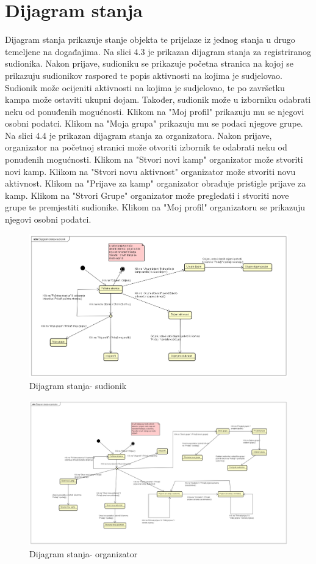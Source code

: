 			\eject
		
		\section{Dijagram stanja}
		
		Dijagram stanja prikazuje stanje objekta te prijelaze iz jednog stanja u drugo temeljene na događajima. Na slici 4.3 je prikazan dijagram stanja za registriranog sudionika. Nakon prijave, sudioniku se prikazuje početna stranica na kojoj se prikazuju sudionikov raspored te popis aktivnosti na kojima je sudjelovao. Sudionik može ocijeniti aktivnosti na kojima je sudjelovao, te po završetku kampa može ostaviti ukupni dojam. Također, sudionik može u izborniku odabrati neku od ponuđenih mogućnosti. Klikom na "Moj profil" prikazuju mu se njegovi osobni podatci. Klikom na "Moja grupa" prikazuju mu se podaci njegove grupe. Na slici 4.4 je prikazan dijagram stanja za organizatora. Nakon prijave, organizator na početnoj stranici može otvoriti izbornik te odabrati neku od ponuđenih mogućnosti. Klikom na "Stvori novi kamp" organizator može stvoriti novi kamp. Klikom na "Stvori novu aktivnost" organizator može stvoriti novu aktivnost. Klikom na "Prijave za kamp" organizator obrađuje pristigle prijave za kamp. Klikom na "Stvori Grupe" organizator može pregledati i stvoriti nove grupe te premjestiti sudionike. Klikom na "Moj profil" organizatoru se prikazuju njegovi osobni podatci.  
		\begin{figure}[H]
			\centerline{\includegraphics[width=\linewidth]{slike/Dijagram_stanja_sudionik.png}}
			\caption{Dijagram stanja- sudionik }
			\label{fig:dijagram_stanja_sudionik}
		\end{figure}
		
		\eject	
		
		\begin{figure}[H]
			\centerline{\includegraphics[width=\linewidth]{slike/Dijagram_stanja_organizator.png}}
			\caption{Dijagram stanja- organizator }
			\label{fig:dijagram_stanja_organizator}
		\end{figure}
		
		\eject			

		
	
